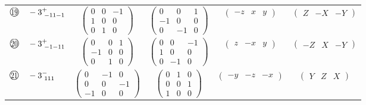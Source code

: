 \documentclass[fleqn,10pt,landscape]{jsarticle}
\begin{document}
\begin{center}
\begin{longtable}{lcccc}
$ {\ooalign{\hfil\resizebox{.8\width}{\height}{19}\hfil\crcr\raise.1ex\hbox{\large$\bigcirc$}}}\quad -3^{+}_{\,\,-11-1} $ & $ \begin{pmatrix} 0 & 0 & -1 \\ 1 & 0 & 0 \\ 0 & 1 & 0 \end{pmatrix} $ & $ \begin{pmatrix} 0 & 0 & 1 \\ -1 & 0 & 0 \\ 0 & -1 & 0 \end{pmatrix} $ & $ \begin{pmatrix} - z & x & y \end{pmatrix} $ & $ \begin{pmatrix} Z & - X & - Y \end{pmatrix} $ \\
$ {\ooalign{\hfil\resizebox{.8\width}{\height}{20}\hfil\crcr\raise.1ex\hbox{\large$\bigcirc$}}}\quad -3^{+}_{\,\,-1-11} $ & $ \begin{pmatrix} 0 & 0 & 1 \\ -1 & 0 & 0 \\ 0 & 1 & 0 \end{pmatrix} $ & $ \begin{pmatrix} 0 & 0 & -1 \\ 1 & 0 & 0 \\ 0 & -1 & 0 \end{pmatrix} $ & $ \begin{pmatrix} z & - x & y \end{pmatrix} $ & $ \begin{pmatrix} - Z & X & - Y \end{pmatrix} $ \\
$ {\ooalign{\hfil\resizebox{.8\width}{\height}{21}\hfil\crcr\raise.1ex\hbox{\large$\bigcirc$}}}\quad -3^{-}_{\,\,111} $ & $ \begin{pmatrix} 0 & -1 & 0 \\ 0 & 0 & -1 \\ -1 & 0 & 0 \end{pmatrix} $ & $ \begin{pmatrix} 0 & 1 & 0 \\ 0 & 0 & 1 \\ 1 & 0 & 0 \end{pmatrix} $ & $ \begin{pmatrix} - y & - z & - x \end{pmatrix} $ & $ \begin{pmatrix} Y & Z & X \end{pmatrix} $ \\

\end{longtable}
\end{center}
\end{document}
